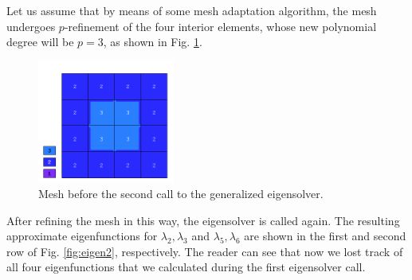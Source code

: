 \documentclass[preprint ,12pt]{elsarticle}
\begin{document}
Let us assume that by means of some mesh adaptation algorithm, the mesh undergoes 
$p$-refinement of the four interior elements, whose new polynomial degree 
will be $p = 3$, as shown in Fig. \ref{fig:mesh2}.

\begin{figure}[!ht]
\begin{center}
\includegraphics[width=0.4\textwidth]{img/mesh_2.png}
\end{center}
\vspace{-5mm}
\caption{Mesh before the second call to the generalized eigensolver.}
\label{fig:mesh2}
\end{figure}

After refining the mesh in this way, the eigensolver is called again. 
The resulting approximate eigenfunctions for $\lambda_2, \lambda_3$ and $\lambda_5, \lambda_6$
are shown in the first and second row of Fig. \ref{fig:eigen2}, respectively.
The reader can see that now we lost track of all four eigenfunctions 
that we calculated during the first eigensolver call. 
\end{document}
